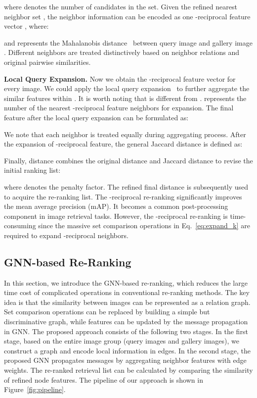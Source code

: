 \documentclass[10pt,twocolumn,letterpaper]{article}
\begin{document}
where  denotes the number of candidates in the set. Given the refined nearest neighbor set , the neighbor information can be encoded as one -reciprocal feature vector , where:


and  represents the Mahalanobis distance~\cite{de2000mahalanobis} between query image  and gallery image . Different neighbors are treated distinctively based on neighbor relations and original pairwise similarities.

\noindent  \textbf{Local Query Expansion.}
Now we obtain the -reciprocal feature vector for every image. We could apply the local query expansion~\cite{chum2007total} to further aggregate the similar features within . It is worth noting that  is different from .  represents the number of the nearest -reciprocal feature neighbors for expansion. The final feature after the local query expansion can be formulated as:

We note that each neighbor is treated equally during aggregating process. After the expansion of -reciprocal feature, the general Jaccard distance is defined as: 


Finally, distance  combines the original distance and Jaccard distance to revise the initial ranking list:

where  denotes the penalty factor. The refined final distance is subsequently used to acquire the re-ranking list.
The -reciprocal re-ranking significantly improves the mean average precision (mAP). It becomes a common post-processing component in image retrieval tasks. However, the -reciprocal re-ranking is time-consuming since the massive set comparison operations in Eq.~\ref{eq:expand_k} are required to expand -reciprocal neighbors.

\subsection{GNN-based Re-Ranking} \label{sec:gnn} 
In this section, we introduce the GNN-based re-ranking, which reduces the large time cost of complicated operations in conventional re-ranking methods. 
The key idea is that the similarity between images can be represented as a relation graph. 
Set comparison operations can be replaced by building a simple but discriminative graph, while features can be updated by the message propagation in GNN.
The proposed approach consists of the following two stages.
In the first stage, based on the entire image group (query images and gallery images), we construct a graph and encode local information in edges. In the second stage, the proposed GNN propagates messages by aggregating neighbor features with edge weights. The re-ranked retrieval list can be calculated by comparing the similarity of refined node features. The pipeline of our approach is shown in Figure~\ref{fig:pipeline}.
\end{document}
